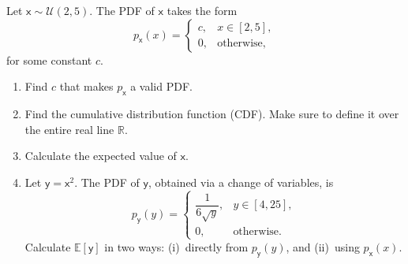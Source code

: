 \begin{exercise} %
    Let $\mathsf{x} \sim \mathcal{U}(2,5)$. The PDF of $\mathsf{x}$ takes the form
    \[
        p_{\mathsf{x}}(x) =
        \begin{cases}
            c, & x \in [2, 5], \\
            0, & \text{otherwise,}
        \end{cases}
    \]
    for some constant $c$. 
        \begin{enumerate}[label=(\alph*)]
            \item Find $c$ that makes $p_{\mathsf{x}}$ a valid PDF.
            \item Find the cumulative distribution function (CDF). Make sure to define it over the entire real line $\mathbb{R}$.
            \item Calculate the expected value of $\mathsf{x}$.
            \item Let $\mathsf{y} = \mathsf{x}^{2}$. The PDF of $\mathsf{y}$, obtained via a change of variables, is
                \[
                    p_{\mathsf{y}}(y) =
                    \begin{cases}
                        \dfrac{1}{6\sqrt{y}}, & y \in [4, 25], \\[4pt]
                        0,                    & \text{otherwise.}
                    \end{cases}
                \]
                Calculate $\mathbb{E}[\mathsf{y}]$ in two ways: (i)~directly from $p_{\mathsf{y}}(y)$, and (ii)~using $p_{\mathsf{x}}(x)$.
    \end{enumerate}
\end{exercise}

